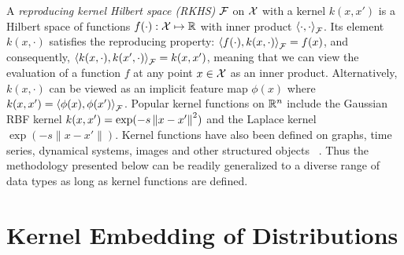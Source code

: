 \documentclass{article}
\begin{document}
A \emph{reproducing kernel Hilbert space (RKHS)} $\mathcal{F}$ on $\mathcal{X}$ with a kernel $k(x,x')$ is a Hilbert space of
functions $f(\cdot):\mathcal{X} \mapsto \mathbb{R}$ with inner product $\left\langle \cdot,\cdot \right\rangle_{\mathcal{F}}$. Its element $k(x,\cdot)$ satisfies the reproducing property:
$\left\langle f(\cdot),k(x, \cdot) \right\rangle_{\mathcal{F}} = f(x)$, and consequently, $\left\langle k(x,\cdot),k(x', \cdot) \right\rangle_{\mathcal{F}} = k(x,x')$,
meaning that we can view the evaluation of a function $f$ at any point $x\in\mathcal{X}$ as an inner product. Alternatively, $k(x,\cdot)$ can  be viewed as an implicit feature map $\phi(x)$ where $k(x,x')=\left\langle \phi(x),\phi(x') \right\rangle_{\mathcal{F}}$.
Popular kernel functions on $\mathbb{R}^n$ include the Gaussian RBF kernel $k(x,x') = \exp(-s
  \left\|x-x'\right\|^2)$ and the Laplace kernel $\exp(-s \|x - x'\|)$. Kernel functions have also been defined on
graphs, time series, dynamical systems, images and other structured
objects \, \cite{SchTsuVer04}. Thus the methodology presented below can be readily generalized to a diverse range of data types as long as kernel functions are defined.

%



\section{Kernel Embedding of Distributions}
\label{sec:embedding}
\end{document}

